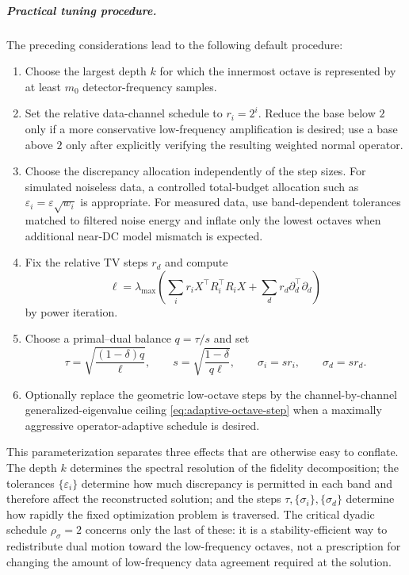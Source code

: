 \documentclass{article}
\begin{document}
\subparagraph{Practical tuning procedure.}
The preceding considerations lead to the following default procedure:
\begin{enumerate}[label=\textup{(\roman*)}]
\item
Choose the largest depth $k$ for which the innermost octave is
represented by at least $m_0$ detector-frequency samples.

\item
Set the relative data-channel schedule to
$r_i=2^i$.  Reduce the base below $2$ only if a more conservative
low-frequency amplification is desired; use a base above $2$ only
after explicitly verifying the resulting weighted normal operator.

\item
Choose the discrepancy allocation independently of the step sizes.
For simulated noiseless data, a controlled total-budget allocation
such as $\varepsilon_i=\varepsilon\sqrt{w_i}$ is appropriate.
For measured data, use band-dependent tolerances matched to filtered
noise energy and inflate only the lowest octaves when additional
near-DC model mismatch is expected.

\item
Fix the relative TV steps $r_d$ and compute
\[
\ell
=
\lambda_{\max}
\left(
\sum_i r_iX^\top R_i^\top R_iX
+
\sum_dr_d\partial_d^\top\partial_d
\right)
\]
by power iteration.

\item
Choose a primal--dual balance $q=\tau/s$ and set
\[
\tau
=
\sqrt{\frac{(1-\delta)q}{\ell}},
\qquad
s
=
\sqrt{\frac{1-\delta}{q\ell}},
\qquad
\sigma_i=sr_i,
\qquad
\sigma_d=sr_d.
\]

\item
Optionally replace the geometric low-octave steps by the
channel-by-channel generalized-eigenvalue ceiling
\eqref{eq:adaptive-octave-step} when a maximally aggressive
operator-adaptive schedule is desired.
\end{enumerate}

This parameterization separates three effects that are otherwise easy
to conflate.  The depth $k$ determines the spectral resolution of the
fidelity decomposition; the tolerances $\{\varepsilon_i\}$ determine
how much discrepancy is permitted in each band and therefore affect
the reconstructed solution; and the steps
$\tau,\{\sigma_i\},\{\sigma_d\}$ determine how rapidly the fixed
optimization problem is traversed.  The critical dyadic schedule
$\rho_\sigma=2$ concerns only the last of these: it is a
stability-efficient way to redistribute dual motion toward the
low-frequency octaves, not a prescription for changing the amount of
low-frequency data agreement required at the solution.
\end{document}
